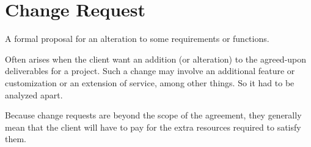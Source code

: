 \section{Change Request}
\label{sec:Change Request}

A formal proposal for an alteration to some requirements or functions.

Often arises when the client want an addition (or alteration) to the agreed-upon deliverables for a project. Such a change may involve an additional feature or customization or an extension of service, among other things. So it had to be analyzed apart.

Because change requests are beyond the scope of the agreement, they generally mean that the client will have to pay for the extra resources required to satisfy them.